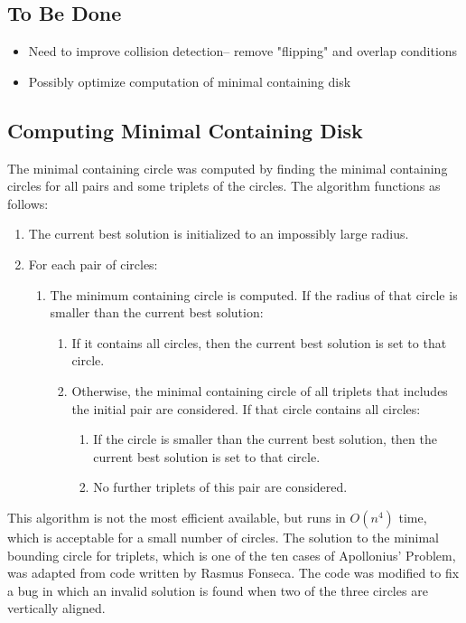 \documentclass[a4paper]{article}
\begin{document}
 \subsection{To Be Done}
  \begin{multicols}{2}
 \begin{itemize}
\item Need to improve collision detection-- remove "flipping" and overlap conditions
\item Possibly optimize computation of minimal containing disk
\end{itemize}
\end{multicols}
 
\subsection{Computing Minimal Containing Disk}
The minimal containing circle was computed by finding the minimal containing circles for all pairs and some triplets of the circles.
The algorithm functions as follows:
\begin{enumerate}
	\item The current best solution is initialized to an impossibly large radius.
	\item For each pair of circles:
	\begin{enumerate}
		\item The minimum containing circle is computed.  If the radius of that circle is smaller than the current best solution:
		\begin{enumerate}
			\item If it contains all circles, then the current best solution is set to that circle.
			\item Otherwise, the minimal containing circle of all triplets that includes the initial pair are considered.  If that circle contains all circles:
			\begin{enumerate}
				\item If the circle is smaller than the current best solution, then the current best solution is set to that circle.
				\item No further triplets of this pair are considered.
			\end{enumerate}
		\end{enumerate}
	\end{enumerate}
\end{enumerate}

This algorithm is not the most efficient available, but runs in $O(n^4)$ time, which is acceptable for a small number of circles.
The solution to the minimal bounding circle for triplets, which is one of the ten cases of Apollonius' Problem, was adapted from code written by Rasmus Fonseca.
The code was modified to fix a bug in which an invalid solution is found when two of the three circles are vertically aligned.
\end{document}
